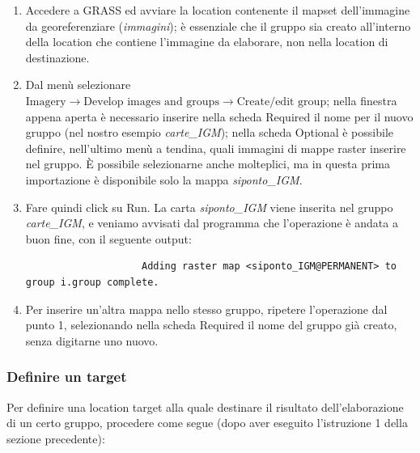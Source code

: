 			\begin{enumerate}
				\item Accedere a GRASS ed avviare la location contenente il mapset dell'immagine da georeferenziare (\emph{immagini}); è essenziale che il gruppo sia creato all'interno della location che contiene l'immagine da elaborare, non nella location di destinazione.
				\item Dal menù selezionare \textsf{$\text{Imagery}\rightarrow\text{Develop~images~and~groups}\rightarrow\text{Create/edit~group}$}; nella finestra appena aperta è necessario inserire nella scheda \textsf{Required} il nome per il nuovo gruppo (nel nostro esempio \emph{carte\_IGM}); nella scheda \textsf{Optional} è possibile definire, nell'ultimo menù a tendina, quali immagini di mappe raster inserire nel gruppo. È possibile selezionarne anche molteplici, ma in questa prima importazione è disponibile solo la mappa \emph{siponto\_IGM}.
				\item Fare quindi click su \textsf{Run}. La carta \emph{siponto\_IGM} viene inserita nel gruppo \emph{carte\_IGM}, e veniamo avvisati dal programma che l'operazione è andata a buon fine, con il seguente output:\\

				\begin{verbatim}
					Adding raster map <siponto_IGM@PERMANENT> to group i.group complete.
				\end{verbatim}
			
				\item Per inserire un'altra mappa nello stesso gruppo, ripetere l'operazione dal punto 1, selezionando nella scheda \textsf{Required} il nome del gruppo già creato, senza digitarne uno nuovo.
			\end{enumerate}

			
			
		\subsubsection{\label{sub:Definire-un-target}Definire un target}
			Per definire una location target alla quale destinare il risultato dell'elaborazione di un certo gruppo, procedere come segue (dopo aver eseguito l'istruzione 1 della sezione precedente):
			
